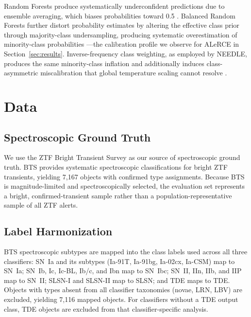 \documentclass[twocolumn]{aastex631}
\begin{document}
Random Forests produce systematically underconfident predictions
due to ensemble averaging, which biases probabilities toward 0.5
\citep{niculescumizil2005, bostrom2008}. Balanced Random Forests
further distort probability estimates by altering the effective
class prior through majority-class undersampling, producing
systematic overestimation of minority-class probabilities
\citep{vandengoorbergh2022}---the calibration profile we observe
for ALeRCE in Section~\ref{sec:results}. Inverse-frequency class
weighting, as employed by NEEDLE, produces the same minority-class
inflation and additionally induces class-asymmetric miscalibration
that global temperature scaling cannot resolve
\citep{vandengoorbergh2022, kull2019}.


\section{Data}\label{sec:data}

\subsection{Spectroscopic Ground Truth}\label{sec:groundtruth}

We use the ZTF Bright Transient Survey
\citep[BTS;][]{fremling2020, perley2020} as our source of
spectroscopic ground truth. BTS provides systematic spectroscopic
classifications for bright ZTF transients, yielding 7,167 objects
with confirmed type assignments. Because BTS is magnitude-limited
and spectroscopically selected, the evaluation set represents a
bright, confirmed-transient sample rather than a
population-representative sample of all ZTF alerts.

\subsection{Label Harmonization}\label{sec:labels}

BTS spectroscopic subtypes are mapped into the class labels used
across all three classifiers: SN~Ia and its subtypes (Ia-91T,
Ia-91bg, Ia-02cx, Ia-CSM) map to SN~Ia; SN~Ib, Ic, Ic-BL, Ib/c,
and Ibn map to SN~Ibc; SN~II, IIn, IIb, and IIP map to SN~II;
SLSN-I and SLSN-II map to SLSN; and TDE maps to TDE. Objects
with types absent from all classifier taxonomies (novae, LRN, LBV)
are excluded, yielding 7,116 mapped objects. For classifiers
without a TDE output class, TDE objects are excluded from that
classifier-specific analysis.
\end{document}
